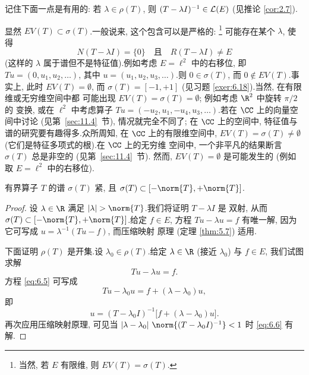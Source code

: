 记住下面一点是有用的: 若 $\lambda\in\rho(T)$, 则
$(T-\lambda I)^{-1}\in\mathcal{L}(E)$ (见推论  \ref{cor:2.7}).

\begin{remark}
\label{rem:6.6}
显然 $EV(T)\subset\sigma(T)$.一般说来, 这个包含可以是严格的:
\footnote{当然, 若 $E$ 有限维, 则 $EV(T)=\sigma(T)$.}
可能存在某个 $\lambda$, 使得
\begin{equation*}
N(T-\lambda I)=\{0\}\quad\text{且}\quad R(T-\lambda I)\ne E
\end{equation*}
(这样的 $\lambda$ 属于谱但不是特征值).例如考虑 $E=\ell^2$ 中的右移位,
即 $Tu=(0,u_1,u_2,\dots)$, 其中 $u=(u_1,u_2,u_3,\dots)$.则
$0\in\sigma(T)$, 而 $0\notin EV(T)$.事实上, 此时 $EV(T)=\emptyset$, 而
$\sigma(T)=[-1,+1]$ (见习题  \ref{exer:6.18}).当然, 在有限维或无穷维空间中都
可能出现 $EV(T)=\sigma(T)=\emptyset$; 例如考虑 $\R^2$ 中旋转 $\pi/2$ 的
变换, 或在 $\ell^2$ 中考虑算子 $Tu=(-u_2,u_1,-u_4,u_3,\dots)$.若在 $\CC$
上的向量空间中讨论 (见第~\ref{sec:11.4}~节), 情况就完全不同了; 在 $\CC$ 上的空间中,
特征值与谱的研究要有趣得多.众所周知, 在 $\CC$ 上的有限维空间中,
$EV(T)=\sigma(T)\ne\emptyset$ (它们是特征多项式的根).在 $\CC$ 上的无穷维
空间中, 一个非平凡的结果断言 $\sigma(T)$ 总是非空的 (见第~\ref{sec:11.4}~节).
然而, $EV(T)=\emptyset$ 是可能发生的 (例如取 $E=\ell^2$ 中的右移位).
\end{remark}

\begin{proposition}
\label{prop:6.7}
有界算子 $T$ 的谱 $\sigma(T)$ 紧, 且
$\sigma(T)\subset[-\norm{T},+\norm{T}]$.
\end{proposition}

\begin{proof}
设 $\lambda\in\R$ 满足 $\abs{\lambda}>\norm{T}$.我们将证明 $T-\lambda I$ 是
双射, 从而 $\sigma(T)\subset[-\norm{T},+\norm{T}]$.给定 $f\in E$, 方程
$Tu-\lambda u=f$ 有唯一解, 因为它可写成 $u=\lambda^{-1}(Tu-f)$, 而压缩映射
原理 (定理  \ref{thm:5.7}) 适用.

下面证明 $\rho(T)$ 是开集.设 $\lambda_0\in\rho(T)$.给定 $\lambda\in\R$
(接近 $\lambda_0$) 与 $f\in E$, 我们试图求解
\begin{equation}
Tu-\lambda u=f.
\label{eq:6.5}
\end{equation}
方程 \eqref{eq:6.5} 可写成
\begin{equation*}
Tu-\lambda_0u=f+(\lambda-\lambda_0)u,
\end{equation*}
即
\begin{equation}
u=(T-\lambda_0I)^{-1}\bigl[f+(\lambda-\lambda_0)u\bigr].
\label{eq:6.6}
\end{equation}
再次应用压缩映射原理, 可见当
$\abs{\lambda-\lambda_0}\,\norm{(T-\lambda_0I)^{-1}}<1$ 时 \eqref{eq:6.6}
有解.
\end{proof}

